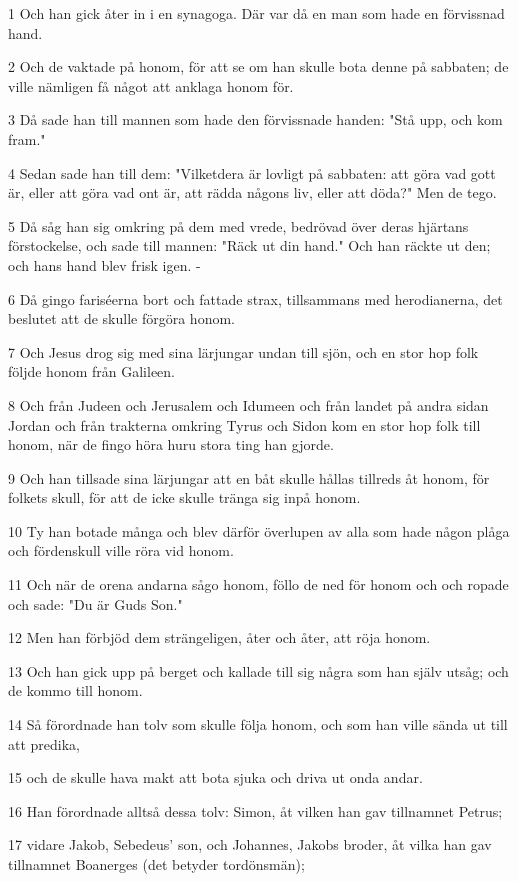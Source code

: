 \par 1 Och han gick åter in i en synagoga. Där var då en man som hade en förvissnad hand.
\par 2 Och de vaktade på honom, för att se om han skulle bota denne på sabbaten; de ville nämligen få något att anklaga honom för.
\par 3 Då sade han till mannen som hade den förvissnade handen: "Stå upp, och kom fram."
\par 4 Sedan sade han till dem: "Vilketdera är lovligt på sabbaten: att göra vad gott är, eller att göra vad ont är, att rädda någons liv, eller att döda?" Men de tego.
\par 5 Då såg han sig omkring på dem med vrede, bedrövad över deras hjärtans förstockelse, och sade till mannen: "Räck ut din hand." Och han räckte ut den; och hans hand blev frisk igen. -
\par 6 Då gingo fariséerna bort och fattade strax, tillsammans med herodianerna, det beslutet att de skulle förgöra honom.
\par 7 Och Jesus drog sig med sina lärjungar undan till sjön, och en stor hop folk följde honom från Galileen.
\par 8 Och från Judeen och Jerusalem och Idumeen och från landet på andra sidan Jordan och från trakterna omkring Tyrus och Sidon kom en stor hop folk till honom, när de fingo höra huru stora ting han gjorde.
\par 9 Och han tillsade sina lärjungar att en båt skulle hållas tillreds åt honom, för folkets skull, för att de icke skulle tränga sig inpå honom.
\par 10 Ty han botade många och blev därför överlupen av alla som hade någon plåga och fördenskull ville röra vid honom.
\par 11 Och när de orena andarna sågo honom, föllo de ned för honom och och ropade och sade: "Du är Guds Son."
\par 12 Men han förbjöd dem strängeligen, åter och åter, att röja honom.
\par 13 Och han gick upp på berget och kallade till sig några som han själv utsåg; och de kommo till honom.
\par 14 Så förordnade han tolv som skulle följa honom, och som han ville sända ut till att predika,
\par 15 och de skulle hava makt att bota sjuka och driva ut onda andar.
\par 16 Han förordnade alltså dessa tolv: Simon, åt vilken han gav tillnamnet Petrus;
\par 17 vidare Jakob, Sebedeus' son, och Johannes, Jakobs broder, åt vilka han gav tillnamnet Boanerges (det betyder tordönsmän);
